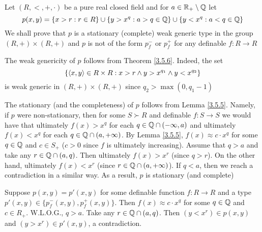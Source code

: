 \documentclass[11pt]{article}
\begin{document}
\begin{examplle}[]
\label{3.5.7}
Let \((R,<,+,\cdot)\) be a pure real closed field and for \(a\in\mathbb{R}_+\setminus\mathbb{Q}\) let
\begin{equation*}
p(x,y)=\{x>r:r\in R\}\cup\{y>x^q:a>q\in\mathbb{Q}\}\cup\{y<x^q:a<q\in\mathbb{Q}\}
\end{equation*}
We shall prove that \(p\) is a stationary (complete) weak generic type in the group \((R,+)\times(R,+)\)
and \(p\) is not of the form \(p_f^-\) or \(p_f^+\) for any definable \(f:R\to R\)

The weak genericity of \(p\) follows from Theorem \ref{3.5.6}. Indeed, the set
\begin{equation*}
\{\langle x,y\rangle\in R\times R:x>r\wedge y>x^{q_1}\wedge y<x^{q_2}\}
\end{equation*}
is weak generic in \((R,+)\times(R,+)\) since \(q_2>\max(0,q_1-1)\)

The stationary (and the completeness) of \(p\) follows from Lemma \ref{3.5.5}. Namely, if \(p\)
were non-stationary, then for some \(S\succ R\) and definable \(f:S\to S\) we would have that
ultimately \(f(x)>x^q\) for each \(q\in\mathbb{Q}\cap(-\infty,a)\) and ultimately \(f(x)<x^q\) for
each \(q\in\mathbb{Q}\cap(a,+\infty)\). By Lemma \ref{3.5.5}, \(f(x)\approx c\cdot x^q\) for some \(q\in\mathbb{Q}\) and \(c\in S_+\)
(\(c>0\) since \(f\) is ultimately increasing). Assume that \(q>a\) and take any \(r\in\mathbb{Q}\cap(a,q)\).
Then ultimately \(f(x)>x^r\) (since \(q>r\)). On the other hand, ultimately \(f(x)<x^r\)
(since \(r\in\mathbb{Q}\cap(a,+\infty)\)). If \(q<a\), then we reach a contradiction in a similar way. As a
result, \(p\) is stationary (and complete) \label{Problem6}

Suppose \(p(x,y)=p'(x,y)\) for some definable function \(f:R\to R\) and a type
\(p'(x,y)\in\{p_f^-(x,y),p_f^+(x,y)\}\). Then \(f(x)\approx c\cdot x^q\) for some \(q\in\mathbb{Q}\) and \(c\in R_+\).
W.L.O.G., \(q>a\). Take any \(r\in\mathbb{Q}\cap(a,q)\). Then \((y<x^r)\in p(x,y)\) and \((y>x^r)\in p'(x,y)\), a
contradiction.
\end{examplle}
\end{document}
